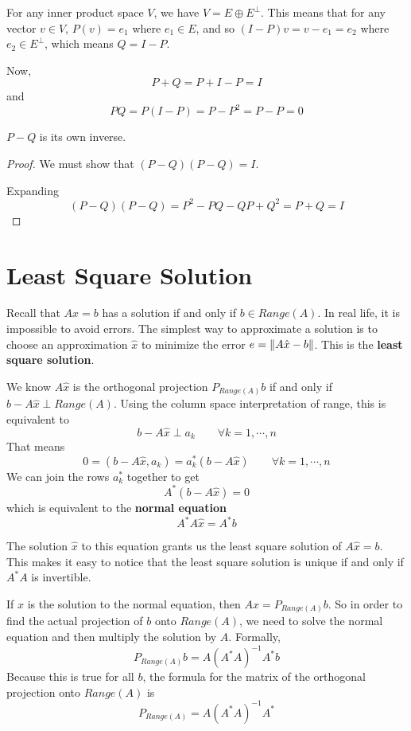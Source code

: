 \begin{lproof}
For any inner product space $V$, we have $V = E \oplus E^{\perp}$. This means that for any vector $v \in V$, $P(v) = e_{1}$ where $e_{1} \in E$, and so $(I - P)v = v - e_{1} = e_{2}$ where $e_{2} \in E^{\perp}$, which means $Q = I - P$. 

Now, $$P + Q = P + I - P = I$$
and $$PQ = P(I - P) = P - P^{2} = P - P = 0$$
\end{lproof}

\begin{theorem}
$P - Q$ is its own inverse. 
\end{theorem}

\begin{proof}
We must show that $(P-Q)(P-Q) = I$. 

Expanding
$$(P-Q)(P-Q) = P^{2} - PQ - QP + Q^{2} = P + Q = I$$
\end{proof}


\section{Least Square Solution} 
Recall that $Ax = b$ has a solution if and only if $b \in Range(A)$. In real life, it is impossible to avoid errors. The simplest way to approximate a solution is to choose an approximation $\hat{x}$ to minimize the error $e = \lVert A \hat{x} - b\rVert$. This is the \textbf{least square solution}. 

We know $A \hat{x}$ is the orthogonal projection $P_{Range(A)} b$ if and only if $b - A \hat{x} \perp Range(A)$. Using the column space interpretation of range, this is equivalent to 
$$b - A \hat{x} \perp a_{k} \qquad \forall k = 1, \cdots, n$$
That means 
$$0 = (b - A \hat{x}, a_{k}) = a^{*}_{k} (b - A \hat{x}) \qquad \forall k = 1, \cdots, n$$ 
We can join the rows $a^{*}_{k}$ together to get
$$A^{*} (b - A \hat{x}) = 0$$
which is equivalent to the \textbf{normal equation} 
$$A^{*} A \hat{x} = A^{*} b$$

The solution $\hat{x}$ to this equation grants us the least square solution of $A \hat{x} = b$. This makes it easy to notice that the least square solution is unique if and only if $A^{*} A$ is invertible. 

If $\hat{x}$ is the solution to the normal equation, then $A \hat{x} = P_{Range(A)} b$. So in order to find the actual projection of $b$ onto $Range(A)$, we need to solve the normal equation and then multiply the solution by $A$. Formally, 
$$P_{Range(A)} b = A (A^{*} A)^{-1} A^{*} b$$
Because this is true for all $b$, the formula for the matrix of the orthogonal projection onto $Range(A)$ is 
$$P_{Range(A)} = A (A^{*} A)^{-1} A^{*}$$

